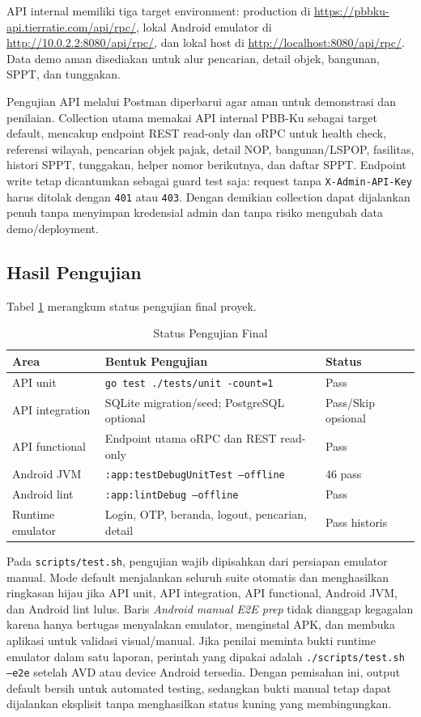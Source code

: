 \documentclass[conference]{report-assets/ref/IEEE-conference-template-062824/IEEEtran}
\begin{document}
API internal memiliki tiga target environment: production di \url{https://pbbku-api.tierratie.com/api/rpc/}, lokal Android emulator di \url{http://10.0.2.2:8080/api/rpc/}, dan lokal host di \url{http://localhost:8080/api/rpc/}. Data demo aman disediakan untuk alur pencarian, detail objek, bangunan, SPPT, dan tunggakan.

Pengujian API melalui Postman diperbarui agar aman untuk demonstrasi dan penilaian. Collection utama memakai API internal PBB-Ku sebagai target default, mencakup endpoint REST read-only dan oRPC untuk health check, referensi wilayah, pencarian objek pajak, detail NOP, bangunan/LSPOP, fasilitas, histori SPPT, tunggakan, helper nomor berikutnya, dan daftar SPPT. Endpoint write  tetap dicantumkan sebagai guard test saja: request tanpa \texttt{X-Admin-API-Key} harus ditolak dengan \texttt{401} atau \texttt{403}. Dengan demikian collection dapat dijalankan penuh tanpa menyimpan kredensial admin dan tanpa risiko mengubah data demo/deployment.

\subsection{Hasil Pengujian}
Tabel \ref{tab:testing} merangkum status pengujian final proyek.

\begin{table}[htbp]
\caption{Status Pengujian Final}
\label{tab:testing}
\centering
\scriptsize
\begin{tabular}{@{}p{} p{} p{}@{}}
\toprule
Area & Bentuk Pengujian & Status \\
\midrule
API unit & \texttt{go test ./tests/unit -count=1} & Pass \\
API integration & SQLite migration/seed; PostgreSQL optional & Pass/Skip opsional \\
API functional & Endpoint utama oRPC dan REST read-only & Pass \\
Android JVM & \texttt{:app:testDebugUnitTest --offline} & 46 pass \\
Android lint & \texttt{:app:lintDebug --offline} & Pass \\
Runtime emulator & Login, OTP, beranda, logout, pencarian, detail & Pass historis \\
\bottomrule
\end{tabular}
\normalsize
\end{table}

Pada \texttt{scripts/test.sh}, pengujian wajib dipisahkan dari persiapan emulator manual. Mode default menjalankan seluruh suite otomatis dan menghasilkan ringkasan hijau jika API unit, API integration, API functional, Android JVM, dan Android lint lulus. Baris \textit{Android manual E2E prep} tidak dianggap kegagalan karena hanya bertugas menyalakan emulator, menginstal APK, dan membuka aplikasi untuk validasi visual/manual. Jika penilai meminta bukti runtime emulator dalam satu laporan, perintah yang dipakai adalah \texttt{./scripts/test.sh --e2e} setelah AVD atau device Android tersedia. Dengan pemisahan ini, output default bersih untuk automated testing, sedangkan bukti manual tetap dapat dijalankan eksplisit tanpa menghasilkan status kuning yang membingungkan.
\end{document}
